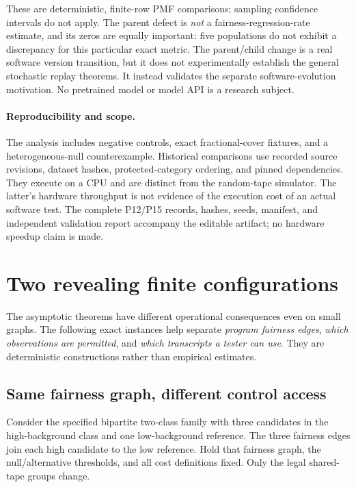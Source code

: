 These are deterministic, finite-row PMF comparisons; sampling confidence intervals do not apply. The parent defect is \emph{not} a fairness-regression-rate estimate, and its zeros are equally important: five populations do not exhibit a discrepancy for this particular exact metric. The parent/child change is a real software version transition, but it does not experimentally establish the general stochastic replay theorems. It instead validates the separate software-evolution motivation. No pretrained model or model API is a research subject.

\paragraph{Reproducibility and scope.} The analysis includes negative controls, exact fractional-cover fixtures, and a heterogeneous-null counterexample. Historical comparisons use recorded source revisions, dataset hashes, protected-category ordering, and pinned dependencies. They execute on a CPU and are distinct from the random-tape simulator. The latter's hardware throughput is not evidence of the execution cost of an actual software test. The complete P12/P15 records, hashes, seeds, manifest, and independent validation report accompany the editable artifact; no hardware speedup claim is made.

\section{Two revealing finite configurations}
\label{sec:worked}
The asymptotic theorems have different operational consequences even on small graphs. The following exact instances help separate \emph{program fairness edges}, \emph{which observations are permitted}, and \emph{which transcripts a tester can use}. They are deterministic constructions rather than empirical estimates.

\subsection{Same fairness graph, different control access}
Consider the specified bipartite two-class family with three candidates in the high-background class and one low-background reference. The three fairness edges join each high candidate to the low reference. Hold that fairness graph, the null/alternative thresholds, and all cost definitions fixed. Only the legal shared-tape groups change.

